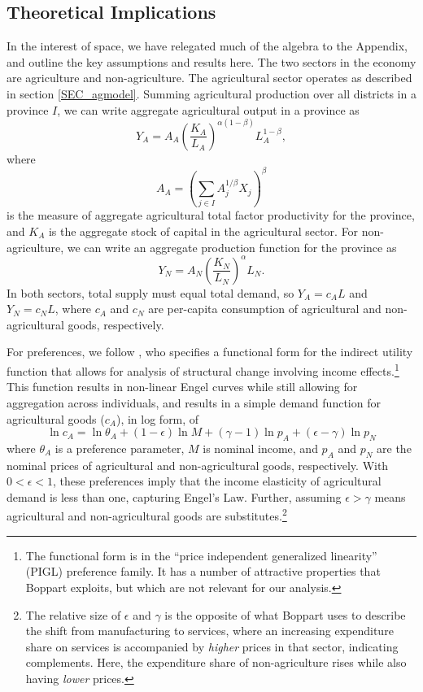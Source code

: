 \documentclass[11pt]{article}
\begin{document}
\subsection{Theoretical Implications}\label{SEC_model}
In the interest of space, we have relegated much of the algebra to the Appendix, and outline the key assumptions and results here. The two sectors in the economy are agriculture and non-agriculture. The agricultural sector operates as described in section \ref{SEC_agmodel}. Summing agricultural production over all districts in a province $I$, we can write aggregate agricultural output in a province as
\begin{equation}
    Y_A = A_A \left(\frac{K_A}{L_A}\right)^{\alpha(1-\beta)} L_A^{1-\beta}, \label{EQ_caL_solve}
\end{equation}
where 
\begin{equation}
    A_A = \left(\sum_{j\in I} A_{j}^{1/\beta}X_{j} \right)^\beta \nonumber
\end{equation}
is the measure of aggregate agricultural total factor productivity for the province, and $K_A$ is the aggregate stock of capital in the agricultural sector. For non-agriculture, we can write an aggregate production function for the province as
\begin{equation}
    Y_N = A_N \left(\frac{K_N}{L_N}\right)^{\alpha} L_N. \label{EQ_YN}
\end{equation}
In both sectors, total supply must equal total demand, so $Y_A = c_A L$ and $Y_N = c_N L$, where $c_A$ and $c_N$ are per-capita consumption of agricultural and non-agricultural goods, respectively.

For preferences, we follow \cite{boppart2014}, who specifies a functional form for the indirect utility function that allows for analysis of structural change involving income effects.\footnote{The functional form is in the ``price independent generalized linearity'' (PIGL) preference family. It has a number of attractive properties that Boppart exploits, but which are not relevant for our analysis.} This function results in non-linear Engel curves while still allowing for aggregation across individuals, and results in a simple demand function for agricultural goods ($c_A$), in log form, of
\begin{equation}
    \ln c_A = \ln \theta_A + (1-\epsilon) \ln M + (\gamma - 1) \ln p_A + (\epsilon - \gamma) \ln p_N \label{EQ_ca_demand}
\end{equation}
where $\theta_A$ is a preference parameter, $M$ is nominal income, and $p_A$ and $p_N$ are the nominal prices of agricultural and non-agricultural goods, respectively. With $0 < \epsilon < 1$, these preferences imply that the income elasticity of agricultural demand is less than one, capturing Engel's Law. Further, assuming $\epsilon > \gamma$ means agricultural and non-agricultural goods are substitutes.\footnote{The relative size of $\epsilon$ and $\gamma$ is the opposite of what Boppart uses to describe the shift from manufacturing to services, where an increasing expenditure share on services is accompanied by \textit{higher} prices in that sector, indicating complements. Here, the expenditure share of non-agriculture rises while also having \textit{lower} prices.}
\end{document}
